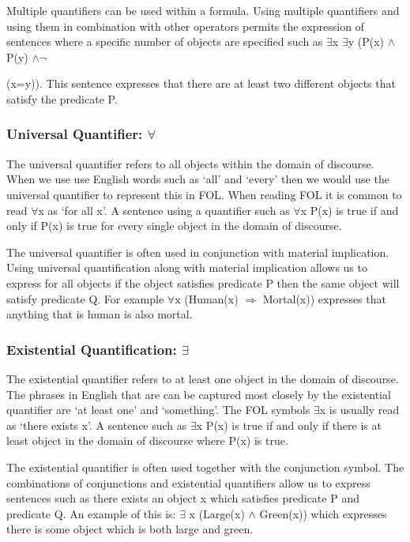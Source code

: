 Multiple quantifiers can be used within a formula. Using multiple quantifiers and using them in combination with other operators permits the expression of sentences where a specific number of objects are specified such as $\exists$x $\exists$y (P(x) $\land$ P(y) $\land \lnot$ {(x=y)). This sentence expresses that there are at least two different objects that satisfy the predicate P.


\subsubsection*{Universal Quantifier: $\forall$}

The universal quantifier refers to all objects within the domain of discourse. When we use use English words such as `all' and `every' then we would use the universal quantifier to represent this in FOL. When reading FOL it is common to read $\forall$x as `for all x'. A sentence using a quantifier such as $\forall$x P(x) is true if and only if P(x) is true for every single object in the domain of discourse.

The universal quantifier is often used in conjunction with material implication. Using universal quantification along with material implication allows us to express for all objects if the object satisfies predicate P then the same object will satisfy predicate Q. For example $\forall$x (Human(x) $\Rightarrow$ Mortal(x)) expresses that anything that is human is also mortal. 

\subsubsection*{Existential Quantification: $\exists$}

The existential quantifier refers to at least one object in the domain of discourse. The phrases in English that are can be captured most closely by the existential quantifier are `at least one' and `something'. The FOL symbols $\exists$x is usually read as `there exists x'. A sentence such as $\exists$x P(x) is true if and only if there is at least object in the domain of discourse where P(x) is true.

The existential quantifier is often used together with the conjunction symbol. The combinations of conjunctions and existential quantifiers allow us to express sentences such as there exists an object x which satisfies predicate P and predicate Q. An example of this is: $\exists$ x (Large(x) $\land $ Green(x)) which expresses there is some object which is both large and green.

}
